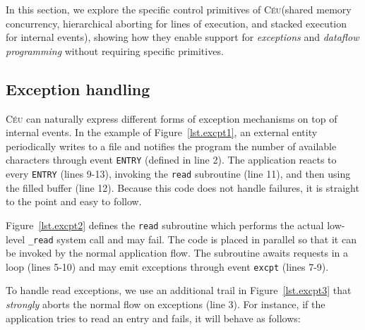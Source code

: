 \documentclass{acm_proc_article-sp}
\newcommand{\CEU}{\textsc{C\'{e}u}\xspace}
\newcommand{\code}[1] {{\small{\texttt{#1}}}}
\newcommand{\1}{\;}
\newcommand{\2}{\;\;}
\newcommand{\3}{\;\;\;}
\newcommand{\5}{\;\;\;\;\;}
\begin{document}
In this section, we explore the specific control primitives of \CEU (shared 
memory concurrency, hierarchical aborting for lines of execution, and stacked 
execution for internal events), showing how they enable support for 
\emph{exceptions} and \emph{dataflow programming} without requiring specific 
primitives.

\subsection{Exception handling}
\label{sec.adv.excpt}

\CEU can naturally express different forms of exception mechanisms on top of 
internal events.
%
In the example of Figure~\ref{lst.excpt1}, an external entity periodically 
writes to a file and notifies the program the number of available characters 
through event \code{ENTRY} (defined in line 2).
The application reacts to every \code{ENTRY} (lines 9-13), invoking the 
\code{read} subroutine (line 11), and then using the filled buffer (line 12).
Because this code does not handle failures, it is straight to the point and 
easy to follow.

Figure~\ref{lst.excpt2} defines the \code{read} subroutine which performs the 
actual low-level \code{\_read} system call and may fail.
The code is placed in parallel so that it can be invoked by the normal 
application flow.
The subroutine awaits requests in a loop (lines 5-10) and may emit
exceptions through event \code{excpt} (lines 7-9).

To handle read exceptions, we use an additional trail in 
Figure~\ref{lst.excpt3} that \emph{strongly} aborts the normal flow on 
exceptions (line 3).
For instance, if the application tries to read an entry and fails, it will 
behave as follows:
\end{document}
